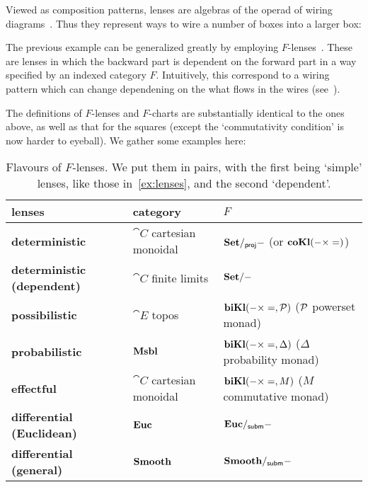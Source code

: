 \begin{remark}
	Viewed as composition patterns, lenses are algebras of the operad of wiring diagrams~\cite{spivak2013operad}.
	Thus they represent ways to wire a number of boxes into a larger box:
	\begin{figure}[H]
	\end{figure}
\end{remark}

\begin{example}
\label{ex:f-lenses}
	The previous example can be generalized greatly by employing $F$-lenses~\cite{spivak_generalized_2019}.
	These are lenses in which the backward part is dependent on the forward part in a way specified by an indexed category $F$.
	Intuitively, this correspond to a wiring pattern which can change dependening on the what flows in the wires (see~\cite{spivak_poly_2020}).

	The definitions of $F$-lenses and $F$-charts are substantially identical to the ones above, as well as that for the squares (except the `commutativity condition' is now harder to eyeball).
	We gather some examples here:
	\begin{table}
		\begin{tabular}{l|l|l}
			\textbf{lenses} & \textbf{category} & $F$\\
			\hline
			\textbf{deterministic} & $\cat C$ cartesian monoidal & $\Set/_{\sf proj} -$ (or $\coKl(- \times =)$) \\
			\textbf{deterministic (dependent)} & $\cat C$ finite limits & $\Set/ -$ \\
			\textbf{possibilistic} & $\cat E$ topos & $\biKl(- \times =, \pow)$ ($\mathcal{P}$ powerset monad)\\
			\textbf{probabilistic} & $\Msbl$ & $\biKl(- \times =, \Delta)$ ($\Delta$ probability monad)\\
			\textbf{effectful} & $\cat C$ cartesian monoidal & $\biKl(- \times =, M)$ ($M$ commutative monad)\\
			\textbf{differential (Euclidean)} & $\Euc$ & $\Euc/_{\sf subm}-$\\
			\textbf{differential (general)} & $\Smooth$ & $\Smooth/_{\sf subm}-$
		\end{tabular}
		\caption{Flavours of $F$-lenses. We put them in pairs, with the first being `simple' lenses, like those in~\cref{ex:lenses}, and the second `dependent'.}
	\end{table}
\end{example}

